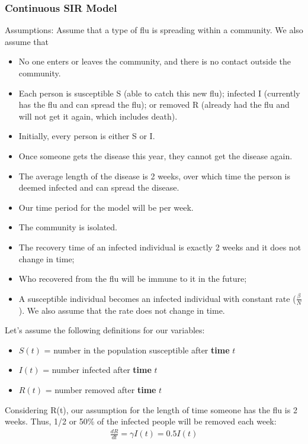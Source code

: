 \documentclass[a4paper]{article}
\begin{document}
        \subsubsection{Continuous SIR Model}
        Assumptions: Assume that a type of flu is spreading within a community. We also assume that
        \begin{itemize}
            \item No one enters or leaves the community, and there is no contact outside the community.
            \item Each person is susceptible S (able to catch this new flu); infected I (currently has the flu and can spread the flu); or removed R (already had the flu and will not get it again, which includes death).
            \item Initially, every person is either S or I.
            \item Once someone gets the disease this year, they cannot get the disease again.
            \item The average length of the disease is 2 weeks, over which time the person is deemed infected and can spread the disease.
            \item Our time period for the model will be per week.
            \item The community is isolated.
            \item The recovery time of an infected individual is exactly 2 weeks and it does not change in time;
            \item Who recovered from the flu will be immune to it in the future;
            \item A susceptible individual becomes an infected individual with constant rate  ($\frac{\beta}{N}$). We also assume that the rate does not change in time.
        \end{itemize}
        
        Let’s assume the following definitions for our variables:
        \begin{itemize}
            \item $S(t)$ = number in the population susceptible after \textbf{time} $t$
            \item $I(t)$ =  number infected after \textbf{time} $t$
            \item $R(t)$ = number removed after \textbf{time} $t$
        \end{itemize}

        \indent Considering R(t), our assumption for the length of time someone has the flu is 2 weeks. Thus, 1/2 or 50\% of the infected people will be removed each week:
        \begin{align*}
            \frac{dR}{dt} = \gamma I(t)= 0.5I(t)
        \end{align*}
        
\end{document}
